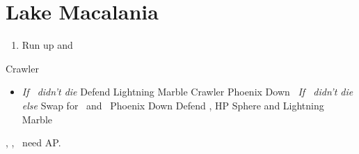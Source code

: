 \chapter{Lake Macalania}

\begin{enumerate}
	\item Run up and \sd
\end{enumerate}
\begin{battle}[16000]{Crawler}
	\begin{itemize}
		\switch{\tidus}{\rikku}
		\rikkuf Lightning Marble x1/2 Negator (1\,000 HP)
		\rikkuf Lightning Marble Crawler
		\kimahrif Lightning Marble Crawler
		\luluf Phoenix Down \rikku
		\item
			  \switch{\kimahri}{\yuna} \textit{If \kimahri\ didn't die}
			  \yunaf Defend
			  \rikkuf Lightning Marble Crawler
			  \luluf Phoenix Down \rikku\ \textit{If \kimahri\ didn't die else} Swap for \yuna\ and \yuna\ Phoenix Down \rikku
		      \switch{\yuna}{\tidus}
		      \tidusf Defend
		      \rikkuf \od, HP Sphere and Lightning Marble
	\end{itemize}
	\tidus, \yuna, \lulu\ need AP.
\end{battle}
